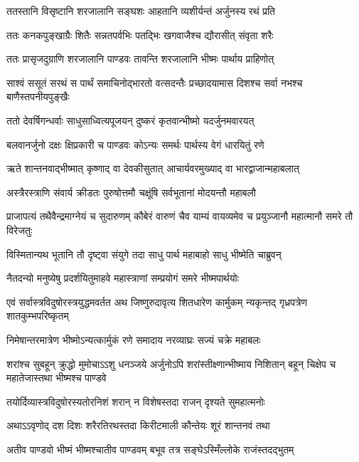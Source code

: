 \twolineshloka
{ततस्तानि विसृष्टानि शरजालानि सङ्घशः}
{आहतानि व्यशीर्यन्तं अर्जुनस्य रथं प्रति}


\twolineshloka
{ततः कनकपुङ्खाग्रैः शितैः सन्नतपर्वभिः}
{पतद्भिः खगवाजैश्च द्यौरासीत् संवृता शरैः}


\twolineshloka
{ततः प्रासृजदुग्राणि शरजालानि पाण्डवः}
{तावन्ति शरजालानि भीष्मः पार्थाय प्राहिणोत्}


\fourlineindentedshloka
{साश्वं ससूतं सरथं स पार्थं}
{समाचिनोद्भारतो वत्सदन्तैः}
{प्रच्छादयामास दिशश्च सर्वा}
{नभश्च बाणैस्तपनीयपुङ्खैः}


\twolineshloka
{ततो देवर्षिगन्धर्वाः साधुसाध्वित्यपूजयन्}
{दुष्करं कृतवान्भीष्मो यदर्जुनमवारयत्}


\twolineshloka
{बलवानर्जुनो दक्षः क्षिप्रकारी च पाण्डवः}
{कोऽन्यः समर्थः पार्थस्य वेगं धारयितुं रणे}


\twolineshloka
{ऋते शान्तनवाद्भीष्मात् कृष्णाद् वा देवकीसुतात्}
{आचार्यवरमुख्याद् वा भारद्वाजान्महाबलात्}


\twolineshloka
{अस्त्रैरस्त्राणि संवार्य क्रीडतः पुरुषोत्तमौ}
{चक्षूंषि सर्वभूतानां मोदयन्तौ महाबलौ}


\threelineshloka
{प्राजापत्यं तथैवैन्द्रमाग्नेयं च सुदारुणम्}
{कौबेरं वारुणं चैव याम्यं वायव्यमेव च}
{प्रयुञ्जानौ महात्मानौ समरे तौ विरेजतुः}


\twolineshloka
{विस्मितान्यथ भूतानि तौ दृष्ट्वा संयुगे तदा}
{साधु पार्थ महाबाहो साधु भीष्मेति चाब्रुवन्}


\twolineshloka
{नैतदन्यो मनुष्येषु प्रदर्शयितुमाहवे}
{महास्त्राणां सम्प्रयोगं समरे भीष्मपार्थयोः}


\onelineshloka
{एवं सर्वास्त्रविदुषोरस्त्रयुद्धमवर्तत}
\twolineshloka
{अथ जिष्णुरुदावृत्य शितधारेण कार्मुकम्}
{न्यकृन्तद् गृध्रपत्रेण शातकुम्भपरिष्कृतम्}


\twolineshloka
{निमेषान्तरमात्रेण भीष्मोऽन्यत्कार्मुकं रणे}
{समादाय नरव्याघ्रः सज्यं चक्रे महाबलः}


\threelineshloka
{शरांश्च सुबहून् क्रुद्धो मुमोचाऽऽशु धनञ्जये}
{अर्जुनोऽपि शरांस्तीक्ष्णान्भीष्माय निशितान् बहून्}
{चिक्षेप च महातेजास्तथा भीष्मश्च पाण्डवे}


\twolineshloka
{तयोर्दिव्यास्त्रविदुषोरस्यतोरनिशं शरान्}
{न विशेषस्तदा राजन् दृश्यते सुमहात्मनोः}


\twolineshloka
{अथाऽऽवृणोद् दश दिशः शरैरतिरथस्तदा}
{किरीटमाली कौन्तेयः शूरं शान्तनवं तथा}


\twolineshloka
{अतीव पाण्डवो भीष्मं भीष्मश्चातीव पाण्डवम्}
{बभूव तत्र सङ्घेऽस्मिँल्लोके राजंस्तदद्भुतम्}


